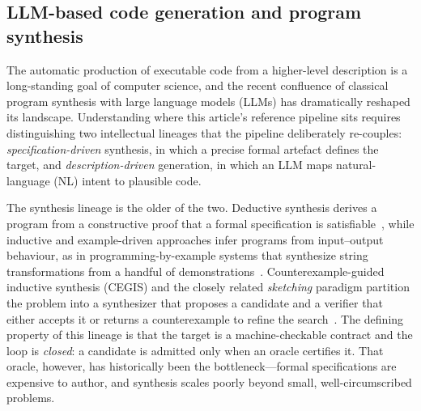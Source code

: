 \subsection{LLM-based code generation and program synthesis}
\label{subsec:rw0}

The automatic production of executable code from a higher-level description is a long-standing goal of computer science, and the recent confluence of classical program synthesis with large language models (LLMs) has dramatically reshaped its landscape. Understanding where this article's reference pipeline sits requires distinguishing two intellectual lineages that the pipeline deliberately re-couples: \emph{specification-driven} synthesis, in which a precise formal artefact defines the target, and \emph{description-driven} generation, in which an LLM maps natural-language (NL) intent to plausible code.

The synthesis lineage is the older of the two. Deductive synthesis derives a program from a constructive proof that a formal specification is satisfiable~\cite{manna1980deductive}, while inductive and example-driven approaches infer programs from input--output behaviour, as in programming-by-example systems that synthesize string transformations from a handful of demonstrations~\cite{gulwani2011flashfill}. Counterexample-guided inductive synthesis (CEGIS) and the closely related \emph{sketching} paradigm partition the problem into a synthesizer that proposes a candidate and a verifier that either accepts it or returns a counterexample to refine the search~\cite{solarlezama2008sketching}. The defining property of this lineage is that the target is a machine-checkable contract and the loop is \emph{closed}: a candidate is admitted only when an oracle certifies it. That oracle, however, has historically been the bottleneck---formal specifications are expensive to author, and synthesis scales poorly beyond small, well-circumscribed problems.

